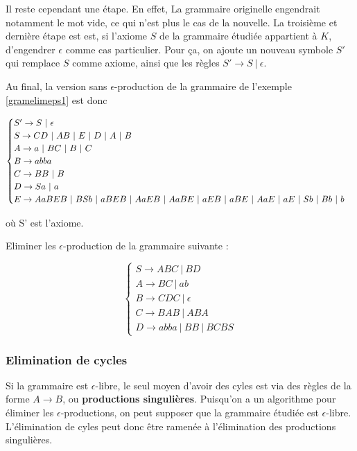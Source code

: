 Il reste cependant une étape. En effet, La grammaire originelle engendrait notamment le mot vide, ce qui n'est plus le cas de la nouvelle. La troisième et dernière étape est est, si l'axiome $S$ de la grammaire étudiée appartient à $K$, d'engendrer $\epsilon$ comme cas particulier. Pour ça, on ajoute un nouveau symbole $S'$ qui remplace $S$ comme axiome, ainsi que les règles $S' \rightarrow S~|~\epsilon$.

\begin{example}

Au final, la version sans $\epsilon$-production de la grammaire de l'exemple \ref{gramelimeps1} est donc 

\[
\begin{cases}
S' \rightarrow S~|~\epsilon \\
S \rightarrow CD~|~AB~|~E\textcolor{black}{~|~D~|~A~|~B} \\
A \rightarrow a~|~BC\textcolor{black}{~|~B~|~C} \\
B \rightarrow abba \\
C \rightarrow BB\textcolor{black}{~|~B} \\
D \rightarrow Sa\textcolor{black}{~|~ a} \\
E \rightarrow AaBEB~|~BSb~|~\textcolor{black}{aBEB~|~AaEB~|~AaBE~|~aEB~|~aBE~|~AaE~|~aE~|~Sb~|~Bb~|~b}
\end{cases}
\]

où S' est l'axiome.

\end{example}

\begin{exercice}
Eliminer les $\epsilon$-production de la grammaire suivante :

\[
\begin{cases}
S \rightarrow ABC~|~BD \\
A \rightarrow BC~|~ab \\
B \rightarrow CDC~|~\epsilon \\
C \rightarrow BAB~|~ABA \\
D \rightarrow abba~|~BB~|~BCBS
\end{cases}
\]
\end{exercice}


\subsubsection{Elimination de cycles}

Si la grammaire est $\epsilon$-libre, le seul moyen d'avoir des cyles est via des règles de la forme $A \rightarrow B$, ou \textbf{productions singulières}. Puisqu'on a un algorithme pour éliminer les $\epsilon$-productions, on peut supposer que la grammaire étudiée est $\epsilon$-libre. L'élimination de cyles peut donc être ramenée à l'élimination des productions singulières.

